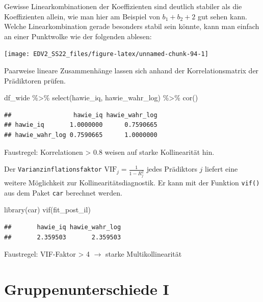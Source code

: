 \documentclass[
]{book}
\newenvironment{Shaded}{\begin{snugshade}}{\end{snugshade}}
\newcommand{\FunctionTok}[1]{\textcolor[rgb]{0.00,0.00,0.00}{#1}}
\newcommand{\NormalTok}[1]{#1}
\newcommand{\SpecialCharTok}[1]{\textcolor[rgb]{0.00,0.00,0.00}{#1}}
\begin{document}
Gewisse Linearkombinationen der Koeffizienten sind deutlich stabiler als die Koeffizienten allein, wie man hier am Beispiel von \(b_1 + b_2 + 2\) gut sehen kann. Welche Linearkombination gerade besonders stabil sein könnte, kann man einfach an einer Punktwolke wie der folgenden ablesen:

\begin{center}\texttt{[image: EDV2\_SS22\_files/figure-latex/unnamed-chunk-94-1]} \end{center}

Paarweise lineare Zusammenhänge lassen sich anhand der Korrelationsmatrix der Prädiktoren prüfen.

\begin{Shaded}
\begin{Highlighting}[]
\NormalTok{df\_wide }\SpecialCharTok{\%\textgreater{}\%} 
  \FunctionTok{select}\NormalTok{(hawie\_iq,}
\NormalTok{         hawie\_wahr\_log) }\SpecialCharTok{\%\textgreater{}\%} 
  \FunctionTok{cor}\NormalTok{()}
\end{Highlighting}
\end{Shaded}

\begin{verbatim}
##                 hawie_iq hawie_wahr_log
## hawie_iq       1.0000000      0.7590665
## hawie_wahr_log 0.7590665      1.0000000
\end{verbatim}

Faustregel: Korrelationen \textgreater{} 0.8 weisen auf starke Kollinearität hin.

Der \texttt{Varianzinflationsfaktor} \(\text{VIF}_j=\frac{1}{1-R_j^2}\) jedes Prädiktors \(j\) liefert eine weitere Möglichkeit zur Kollinearitätsdiagnostik. Er kann mit der Funktion \texttt{vif()} aus dem Paket \texttt{car} berechnet werden.

\begin{Shaded}
\begin{Highlighting}[]
\FunctionTok{library}\NormalTok{(car)}
\FunctionTok{vif}\NormalTok{(fit\_post\_il)}
\end{Highlighting}
\end{Shaded}

\begin{verbatim}
##       hawie_iq hawie_wahr_log 
##       2.359503       2.359503
\end{verbatim}

Faustregel: VIF-Faktor \textgreater{} 4 \(\rightarrow\) starke Multikollinearität

\hypertarget{gruppenunterschiede-i}{%
\chapter{Gruppenunterschiede I}\label{gruppenunterschiede-i}}
\end{document}
